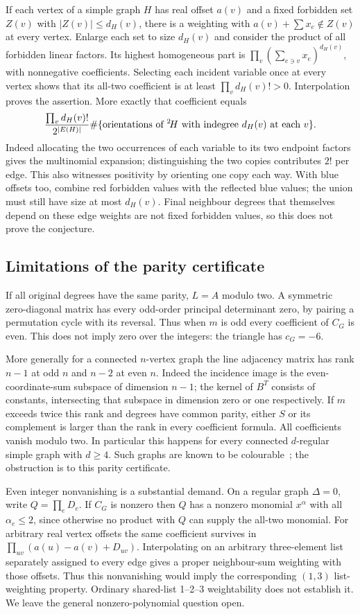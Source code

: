 If each vertex of a simple graph $H$ has real offset $a(v)$ and a
fixed forbidden set $Z(v)$ with $|Z(v)|\le d_H(v)$, there is a
weighting with $a(v)+\sum x_e\notin Z(v)$ at every vertex. Enlarge
each set to size $d_H(v)$ and consider the product of all forbidden
linear factors. Its highest homogeneous part is
$\prod_v(\sum_{e\ni v}x_e)^{d_H(v)}$, with nonnegative coefficients.
Selecting each incident variable once at every vertex shows that its
all-two coefficient is at least $\prod_v d_H(v)!>0$. Interpolation
proves the assertion. More exactly that coefficient equals
\[
 \frac{\prod_v d_H(v)!}{2^{|E(H)|}}
 \#\{\text{orientations of ${}^{2}\!H$ with indegree $d_H(v)$ at each $v$}\}.
\]
Indeed allocating the two occurrences of each variable to its two
endpoint factors gives the multinomial expansion; distinguishing
the two copies contributes $2!$ per edge. This also witnesses
positivity by orienting one copy each way. With blue offsets too, combine red forbidden
values with the reflected blue values; the union must still have size
at most $d_H(v)$. Final neighbour degrees that themselves depend on
these edge weights are not fixed forbidden values, so this does not
prove the conjecture.

\subsection{Limitations of the parity certificate}\label{sec:mod2limits}

If all original degrees have the same parity, $L=A$ modulo two.
A symmetric zero-diagonal matrix has every odd-order principal
determinant zero, by pairing a permutation cycle with its reversal.
Thus when $m$ is odd every coefficient of $C_G$ is even. This does
not imply zero over the integers: the triangle has $c_G=-6$.

More generally for a connected $n$-vertex graph the line adjacency
matrix has rank $n-1$ at odd $n$ and $n-2$ at even $n$. Indeed the
incidence image is the even-coordinate-sum subspace of dimension
$n-1$; the kernel of $B^T$ consists of constants, intersecting that
subspace in dimension zero or one respectively. If $m$ exceeds
twice this rank and degrees have common parity, either $S$ or its
complement is larger than the rank in every coefficient formula.
All coefficients vanish modulo two. In particular this happens for
every connected $d$-regular simple graph with $d\ge4$. Such graphs
are known to be colourable~\cite{GOW26}; the obstruction is to this
parity certificate.

Even integer nonvanishing is a substantial demand. On a regular
graph $\Delta=0$, write $Q=\prod_eD_e$. If $C_G$ is nonzero then
$Q$ has a nonzero monomial $x^\alpha$ with all $\alpha_e\le2$,
since otherwise no product with $Q$ can supply the all-two monomial.
For arbitrary real vertex offsets the same coefficient survives in
$\prod_{uv}(a(u)-a(v)+D_{uv})$. Interpolating on an arbitrary
three-element list separately assigned to every edge gives a proper
neighbour-sum weighting with those offsets. Thus this nonvanishing
would imply the corresponding $(1,3)$ list-weighting property.
Ordinary shared-list 1--2--3 weightability does not establish it.
We leave the general nonzero-polynomial question open.

